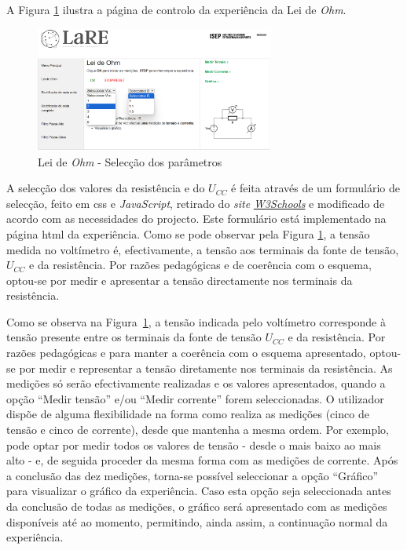 A Figura \ref{fig:pagmenuCTRL} ilustra a página de controlo da experiência da Lei de \textit{Ohm}. 

\begin{figure}[hbtp]
	\centering
	\includegraphics[width=0.7\textwidth]{figures/ohm_page_controlo-FULL.png}
	\caption{Lei de \textit{Ohm} - Selecção dos parâmetros}
	\label{fig:pagmenuCTRL}
\end{figure}

A selecção dos valores da resistência e do $U_{CC}$ é feita através de um formulário de selecção, feito em \acrshort{css} e \textit{JavaScript}, retirado do \textit{site} \href{https://www.w3schools.com/howto/howto_custom_select.asp}{\textit{W3Schools}} e modificado de acordo com as necessidades do projecto. Este formulário está implementado na página \acrshort{html} da experiência. Como se pode observar pela Figura \ref{fig:pagmenuCTRL}, a tensão medida no voltímetro é, efectivamente, a tensão aos terminais da fonte de tensão, $U_{CC}$ e da resistência. Por razões pedagógicas e de coerência com o esquema, optou-se por medir e apresentar a tensão directamente nos terminais da resistência.

Como se observa na Figura~\ref{fig:pagmenuCTRL}, a tensão indicada pelo voltímetro corresponde à tensão presente entre os terminais da fonte de tensão $U_{CC}$ e da resistência. Por razões pedagógicas e para manter a coerência com o esquema apresentado, optou-se por medir e representar a tensão diretamente nos terminais da resistência. As medições só serão efectivamente realizadas e os valores apresentados, quando a opção ``Medir tensão'' e/ou ``Medir corrente'' forem seleccionadas. O utilizador dispõe de alguma flexibilidade na forma como realiza as medições (cinco de tensão e cinco de corrente), desde que mantenha a mesma ordem. Por exemplo, pode optar por medir todos os valores de tensão - desde o mais baixo ao mais alto - e, de seguida proceder da mesma forma com as medições de corrente. Após a conclusão das dez medições, torna-se possível seleccionar a opção ``Gráfico'' para visualizar o gráfico da experiência. Caso esta opção seja seleccionada antes da conclusão de todas as medições, o gráfico será apresentado com as medições disponíveis até ao momento, permitindo, ainda assim, a continuação normal da experiência.

